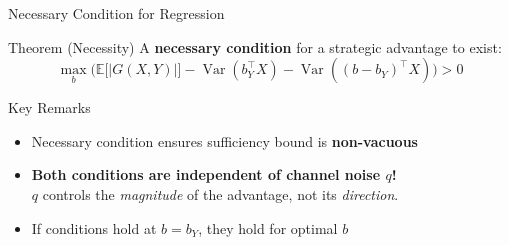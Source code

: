 \documentclass[aspectratio=169, 10pt]{beamer}
\newcommand{\E}{\mathbb{E}}
\DeclareMathOperator{\Var}{Var}
\begin{document}
\begin{frame}{Necessary Condition for Regression}
  \vspace{-2pt}
  \begin{block}{Theorem (Necessity)}
    {\small A \textbf{necessary condition} for a strategic advantage to exist:}
    \vspace{-4pt}
    $$\max_b \Big( \E\big[|G(X,Y)|\big] - \Var(b_Y^\top X) - \Var((b{-}b_Y)^\top X) \Big) > 0$$
  \end{block}
  \vspace{2pt}
  \begin{exampleblock}{Key Remarks}
    \begin{itemize}\setlength{\itemsep}{0pt}
      \item Necessary condition ensures sufficiency bound is \textbf{non-vacuous}
      \item[\textcolor{accentCoral}{$\star$}] \textbf{Both conditions are independent of channel noise $q$!}\\
            {\small $q$ controls the \textit{magnitude} of the advantage, not its \textit{direction}.}
      \item If conditions hold at $b = b_Y$, they hold for optimal $b$
    \end{itemize}
  \end{exampleblock}
  \vspace{2pt}
  \begin{center}
  \end{center}
\end{frame}
\end{document}

